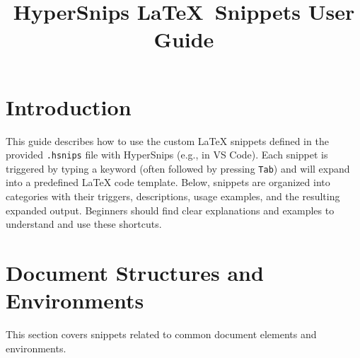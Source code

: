 \documentclass{article}
\title{HyperSnips \LaTeX\ Snippets User Guide}
\author{}
\date{}
\begin{document}
\maketitle
\tableofcontents

\section{Introduction}
This guide describes how to use the custom \LaTeX{} snippets defined in the provided \texttt{.hsnips} file with HyperSnips (e.g., in VS Code). Each snippet is triggered by typing a keyword (often followed by pressing \texttt{Tab}) and will expand into a predefined \LaTeX{} code template. Below, snippets are organized into categories with their triggers, descriptions, usage examples, and the resulting expanded output. Beginners should find clear explanations and examples to understand and use these shortcuts.

\section{Document Structures and Environments}
This section covers snippets related to common document elements and environments.
\end{document}
